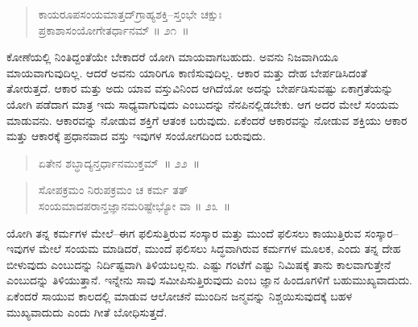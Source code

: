 \begin{verse}
ಕಾಯರೂಪಸಂಯಮಾತ್ತದ್​ಗ್ರಾಹ್ಯಶಕ್ತಿ–ಸ್ತಂಭೇ ಚಕ್ಷುಃ\\ಪ್ರಕಾಶಾಸಂಯೋಗೇತರ್ಧಾನಮ್​ \hfill{॥ ೨೧~॥}
\end{verse}

\vspace{-0.4cm}



\vspace{0.2cm}

ಕೋಣೆಯಲ್ಲಿ ನಿಂತಿದ್ದಂತೆಯೇ ಬೇಕಾದರೆ ಯೋಗಿ ಮಾಯವಾಗಬಹುದು. ಅವನು ನಿಜವಾಗಿಯೂ ಮಾಯವಾಗುವುದಿಲ್ಲ. ಆದರೆ ಅವನು ಯಾರಿಗೂ ಕಾಣಿಸುವುದಿಲ್ಲ. ಆಕಾರ ಮತ್ತು ದೇಹ ಬೇರ್ಪಡಿಸಿದಂತೆ ತೋರುತ್ತದೆ. ಆಕಾರ ಮತ್ತು ಅದು ಯಾವ ವಸ್ತುವಿನಿಂದ ಆಗಿದೆಯೋ ಅದನ್ನು ಬೇರ್ಪಡಿಸುವಷ್ಟು ಏಕಾಗ್ರತೆಯನ್ನು ಯೋಗಿ ಪಡೆದಾಗ ಮಾತ್ರ ಇದು ಸಾಧ್ಯವಾಗುವುದು ಎಂಬುದನ್ನು ನೆನಪಿನಲ್ಲಿಡಬೇಕು. ಆಗ ಅದರ ಮೇಲೆ ಸಂಯಮ ಮಾಡುವನು. ಆಕಾರವನ್ನು ನೋಡುವ ಶಕ್ತಿಗೆ ಆತಂಕ ಬರುವುದು. ಏಕೆಂದರೆ ಆಕಾರವನ್ನು ನೋಡುವ ಶಕ್ತಿಯು ಆಕಾರ ಮತ್ತು ಆಕಾರಕ್ಕೆ ಪ್ರಧಾನವಾದ ವಸ್ತು ಇವುಗಳ ಸಂಯೋಗದಿಂದ ಬರುವುದು. 

\vspace{-0.3cm}

\begin{verse}
ಏತೇನ ಶಬ್ಧಾದ್ಯನ್ತರ್ಧಾನಮುಕ್ತಮ್​~॥ ೨೨~॥
\end{verse}

\vspace{-0.4cm}


\vspace{-0.2cm}

\begin{verse}
ಸೋಪಕ್ರಮಂ ನಿರುಪಕ್ರಮಂ ಚ ಕರ್ಮ ತತ್​\\ಸಂಯಮಾದಪರಾನ್ತಜ್ಞಾನಮರಿಷ್ಟೇಭ್ಯೋ ವಾ \hfill{॥ ೨೩~॥}
\end{verse}

\vspace{-0.3cm}


\vspace{0.1cm}

ಯೋಗಿ ತನ್ನ ಕರ್ಮಗಳ ಮೇಲೆ–ಈಗ ಫಲಿಸುತ್ತಿರುವ ಸಂಸ್ಕಾರ ಮತ್ತು ಮುಂದೆ ಫಲಿಸಲು ಕಾಯುತ್ತಿರುವ ಸಂಸ್ಕಾರ–ಇವುಗಳ ಮೇಲೆ ಸಂಯಮ ಮಾಡಿದರೆ, ಮುಂದೆ ಫಲಿಸಲು ಸಿದ್ಧವಾಗಿರುವ ಕರ್ಮಗಳ ಮೂಲಕ, ಎಂದು ತನ್ನ ದೇಹ ಬೀಳುವುದು ಎಂಬುದನ್ನು ನಿರ್ದಿಷ್ಟವಾಗಿ ತಿಳಿಯಬಲ್ಲನು. ಎಷ್ಟು ಗಂಟೆಗೆ ಎಷ್ಟು ನಿಮಿಷಕ್ಕೆ ತಾನು ಕಾಲವಾಗುತ್ತೇನೆ ಎಂಬುದನ್ನು ತಿಳಿಯುತ್ತಾನೆ. ಇನ್ನೇನು ಸಾವು ಸಮೀಪಿಸುತ್ತಿರುವುದು ಎಂಬ ಜ್ಞಾನ ಹಿಂದೂಗಳಿಗೆ ಬಹುಮುಖ್ಯವಾದುದು. ಏಕೆಂದರೆ ಸಾಯುವ ಕಾಲದಲ್ಲಿ ಮಾಡುವ ಆಲೋಚನೆ ಮುಂದಿನ ಜನ್ಮವನ್ನು ನಿಶ್ಚಯಿಸುವುದಕ್ಕೆ ಬಹಳ ಮುಖ್ಯವಾದುದು ಎಂದು ಗೀತೆ ಬೋಧಿಸುತ್ತದೆ. 

